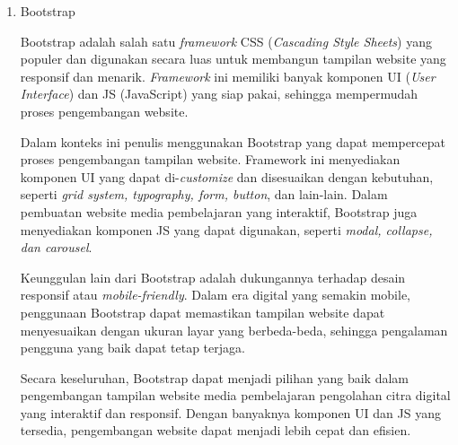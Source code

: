 \begin{enumerate}[leftmargin=1cm, itemindent=0.6cm,labelwidth=15pt, labelsep=5pt, listparindent=1cm,align=left]
    \item Bootstrap

    Bootstrap adalah salah satu \textit{framework} CSS (\textit{Cascading Style Sheets}) yang populer dan digunakan secara luas untuk membangun tampilan website yang responsif dan menarik. \textit{Framework} ini memiliki banyak komponen UI (\textit{User Interface}) dan JS (JavaScript) yang siap pakai, sehingga mempermudah proses pengembangan website.

    Dalam konteks ini penulis menggunakan Bootstrap yang dapat mempercepat proses pengembangan tampilan website. Framework ini menyediakan komponen UI yang dapat di-\textit{customize} dan disesuaikan dengan kebutuhan, seperti \textit{grid system, typography, form, button}, dan lain-lain. Dalam pembuatan website media pembelajaran yang interaktif, Bootstrap juga menyediakan komponen JS yang dapat digunakan, seperti \textit{modal, collapse, dan carousel}.

    Keunggulan lain dari Bootstrap adalah dukungannya terhadap desain responsif atau \textit{mobile-friendly}. Dalam era digital yang semakin mobile, penggunaan Bootstrap dapat memastikan tampilan website dapat menyesuaikan dengan ukuran layar yang berbeda-beda, sehingga pengalaman pengguna yang baik dapat tetap terjaga.

    Secara keseluruhan, Bootstrap dapat menjadi pilihan yang baik dalam pengembangan tampilan website media pembelajaran pengolahan citra digital yang interaktif dan responsif. Dengan banyaknya komponen UI dan JS yang tersedia, pengembangan website dapat menjadi lebih cepat dan efisien.
\end{enumerate}

